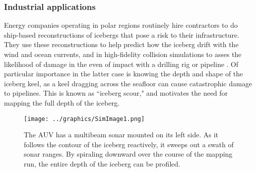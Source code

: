 \subsubsection{Industrial applications}

Energy companies operating in polar regions routinely hire contractors to do ship-based reconstructions of icebergs that pose a risk to their infrastructure. They use these reconstructions to help predict how the iceberg drift with the wind and ocean currents, and in high-fidelity collision simulations to asses the likelihood of damage in the even of impact with a drilling rig or pipeline \cite{ralph2008iceberg} \cite{fuglem1996iceberg}. Of particular importance in the latter case is knowing the depth and shape of the iceberg keel, as a keel dragging across the seafloor can cause catastrophic damage to pipelines. This is known as ``iceberg scour," and motivates the need for mapping the full depth of the iceberg.

%
%


\begin{figure}[htbp]
   \centering
   \texttt{[image: ../graphics/SimImage1.png]} %
   \caption{The AUV has a multibeam sonar mounted on its left side. As it follows the contour of the iceberg reactively, it sweeps out a swath of sonar ranges. By spiraling downward over the course of the mapping run, the entire depth of the iceberg can be profiled.}
   \label{fig:simImage1}
\end{figure}


